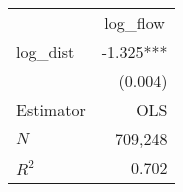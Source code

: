 \begin{tabular}{lr}
\toprule
          & \multicolumn{1}{c}{log_flow} \\ 
\cmidrule(lr){2-2} 
log_dist  &                    -1.325*** \\ 
          &                      (0.004) \\ 
\midrule
Estimator &                          OLS \\ 
\midrule
$N$       &                      709,248 \\ 
$R^2$     &                        0.702 \\ 
\bottomrule
\end{tabular}
